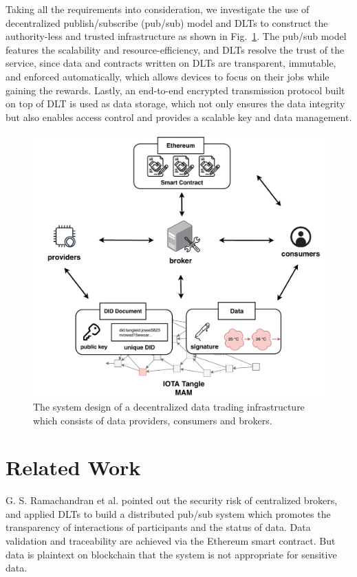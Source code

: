 \documentclass[10pt, conference, compsocconf]{IEEEtran}
\begin{document}
Taking all the requirements into consideration, we investigate the use of decentralized publish/subscribe (pub/sub) model and DLTs to construct the authority-less and trusted infrastructure as shown in Fig.~\ref{fig:system_design}. The pub/sub model features the scalability and resource-efficiency, and DLTs resolve the trust of the service, since data and contracts written on DLTs are transparent, immutable, and enforced automatically, which allows devices to focus on their jobs while gaining the rewards. Lastly, an end-to-end encrypted transmission protocol built on top of DLT is used as data storage, which not only ensures the data integrity but also enables access control and provides a scalable key and data management.

\begin{figure}[!t]
    \centering
    \includegraphics[width=3.in]{system_design}
    \caption{The system design of a decentralized data trading infrastructure which consists of data providers, consumers and brokers.}
    \label{fig:system_design}
\end{figure}

\section{Related Work}
\label{section:relatedWork}
G. S. Ramachandran et al.\cite{trinity} pointed out the security risk of centralized brokers, and applied DLTs to build a distributed pub/sub system which promotes the transparency of interactions of participants and the status of data. Data validation and traceability are achieved via the Ethereum smart contract. But data is plaintext on blockchain that the system is not appropriate for sensitive data.
\end{document}
